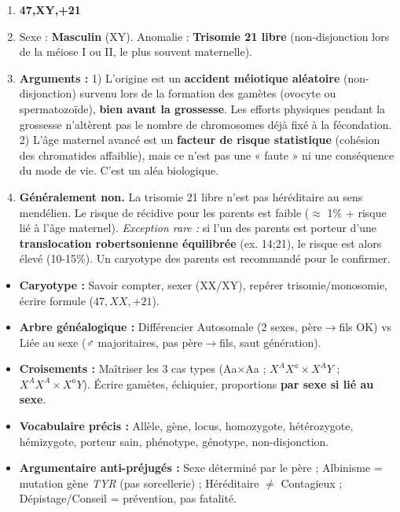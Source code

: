 \documentclass[11pt]{article}
\begin{document}
\begin{corrige}[Exercice 2]
\begin{enumerate}
    \item \textbf{47,XY,+21}
    \item Sexe : \textbf{Masculin} (XY). Anomalie : \textbf{Trisomie 21 libre} (non-disjonction lors de la méiose I ou II, le plus souvent maternelle).
    \item \textbf{Arguments :} 1) L'origine est un \textbf{accident méiotique aléatoire} (non-disjonction) survenu lors de la formation des gamètes (ovocyte ou spermatozoïde), \textbf{bien avant la grossesse}. Les efforts physiques pendant la grossesse n'altèrent pas le nombre de chromosomes déjà fixé à la fécondation. 2) L'âge maternel avancé est un \textbf{facteur de risque statistique} (cohésion des chromatides affaiblie), mais ce n'est pas une « faute » ni une conséquence du mode de vie. C'est un aléa biologique.
    \item \textbf{Généralement non.} La trisomie 21 libre n'est pas héréditaire au sens mendélien. Le risque de récidive pour les parents est faible ($\approx$ 1\% + risque lié à l'âge maternel). \textit{Exception rare :} si l'un des parents est porteur d'une \textbf{translocation robertsonienne équilibrée} (ex. 14;21), le risque est alors élevé (10-15\%). Un caryotype des parents est recommandé pour le confirmer.
\end{enumerate}
\end{corrige}

\begin{aretenir}
\begin{itemize}
    \item \textbf{Caryotype :} Savoir compter, sexer (XX/XY), repérer trisomie/monosomie, écrire formule ($47,XX,+21$).
    \item \textbf{Arbre généalogique :} Différencier Autosomale (2 sexes, père$\to$fils OK) vs Liée au sexe (♂ majoritaires, pas père$\to$fils, saut génération).
    \item \textbf{Croisements :} Maîtriser les 3 cas types (Aa$\times$Aa ; $X^AX^a \times X^AY$ ; $X^AX^A \times X^aY$). Écrire gamètes, échiquier, proportions \textbf{par sexe si lié au sexe}.
    \item \textbf{Vocabulaire précis :} Allèle, gène, locus, homozygote, hétérozygote, hémizygote, porteur sain, phénotype, génotype, non-disjonction.
    \item \textbf{Argumentaire anti-préjugés :} Sexe déterminé par le père ; Albinisme = mutation gène \emph{TYR} (pas sorcellerie) ; Héréditaire $\neq$ Contagieux ; Dépistage/Conseil = prévention, pas fatalité.
\end{itemize}
\end{aretenir}
\end{document}
